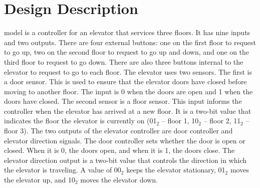 \documentclass[journal]{IEEEtran}
\begin{document}
\section{Design Description}
% 
% 
% 
% 
 model is a controller for an elevator that services three floors. It has nine inputs and two outputs. There are four external buttons: one on the first floor to request to go up, two on the second floor to request to go up and down, and one on the third floor to request to go down. There are also three buttons internal to the elevator to request to go to each floor. The elevator uses two sensors. The first is a door sensor. This is used to ensure that the elevator doors have closed before moving to another floor. The input is 0 when the doors are open and 1 when the doors have closed. The second sensor is a floor sensor. This input informs the controller when the elevator has arrived at a new floor. It is a two-bit value that indicates the floor the elevator is currently on (01$_{2}$ – floor 1, 10$_{2}$ – floor 2, 11$_{2}$ – floor 3). The two outputs of the elevator controller are door controller and elevator direction signals. The door controller sets whether the door is open or closed. When it is 0, the doors open, and when it is 1, the doors close. The elevator direction output is a two-bit value that controls the direction in which the elevator is traveling. A value of 00$_{2}$ keeps the elevator stationary, 01$_{2}$ moves the elevator up, and 10$_{2}$ moves the elevator down.

 

\end{document}
